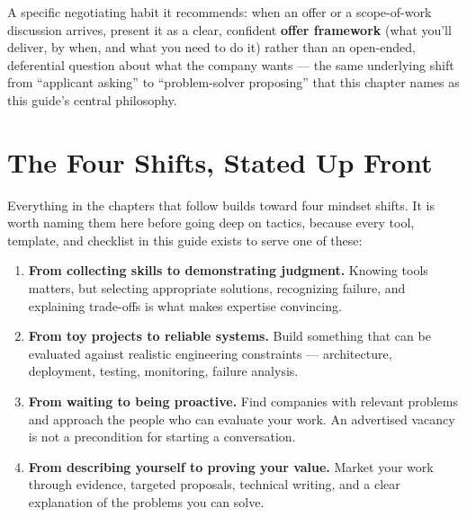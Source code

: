 A specific negotiating habit it recommends: when an offer or a scope-of-work discussion arrives, present it as a
clear, confident \textbf{offer framework} (what you'll deliver, by when, and what you need to do it) rather than
an open-ended, deferential question about what the company wants — the same underlying shift from ``applicant
asking'' to ``problem-solver proposing'' that this chapter names as this guide's central
philosophy.

\section{The Four Shifts, Stated Up Front}

Everything in the chapters that follow builds toward four mindset shifts. It is worth naming them here before
going deep on tactics, because every tool, template, and checklist in this guide exists to serve one of these:

\begin{enumerate}
  \item \textbf{From collecting skills to demonstrating judgment.} Knowing tools matters, but selecting
  appropriate solutions, recognizing failure, and explaining trade-offs is what makes expertise convincing.
  \item \textbf{From toy projects to reliable systems.} Build something that can be evaluated against realistic
  engineering constraints --- architecture, deployment, testing, monitoring, failure analysis.
  \item \textbf{From waiting to being proactive.} Find companies with relevant problems and approach the people
  who can evaluate your work. An advertised vacancy is not a precondition for starting a conversation.
  \item \textbf{From describing yourself to proving your value.} Market your work through evidence, targeted
  proposals, technical writing, and a clear explanation of the problems you can solve.
\end{enumerate}
